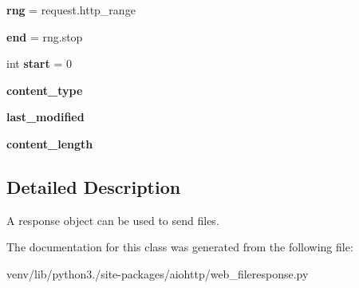 \begin{DoxyCompactItemize}
{\bfseries rng} = request.\+http\+\_\+range
\item 
\mbox{\label{classaiohttp_1_1web__fileresponse_1_1_file_response_a656a18a4d9afd3b8309bc01a3656c07d}} 
{\bfseries end} = rng.\+stop
\item 
\mbox{\label{classaiohttp_1_1web__fileresponse_1_1_file_response_a39489fcfffdcd261f89c068cf1a315af}} 
int {\bfseries start} = 0
\item 
\mbox{\label{classaiohttp_1_1web__fileresponse_1_1_file_response_a150cbdc7628a27807f8e480b1a2323ab}} 
{\bfseries content\+\_\+type}
\item 
\mbox{\label{classaiohttp_1_1web__fileresponse_1_1_file_response_a7d68bd05f403d46ba4aa7961c7e76f3e}} 
{\bfseries last\+\_\+modified}
\item 
\mbox{\label{classaiohttp_1_1web__fileresponse_1_1_file_response_a56fba0dbeac8e9fc1e96724849e029f7}} 
{\bfseries content\+\_\+length}
\end{DoxyCompactItemize}


\subsection{Detailed Description}
\begin{DoxyVerb}A response object can be used to send files.\end{DoxyVerb}
 

The documentation for this class was generated from the following file\+:\begin{DoxyCompactItemize}
\item 
venv/lib/python3./site-\/packages/aiohttp/web\+\_\+fileresponse.\+py\end{DoxyCompactItemize}
